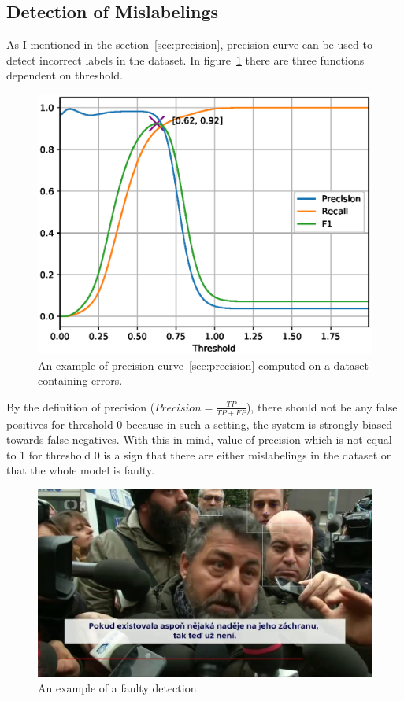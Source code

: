 \subsection{Detection of Mislabelings}\label{subsec:detection-mislabelings}
As I mentioned in the section~\ref{sec:precision}, precision curve can be used to detect incorrect labels in the
dataset.
In figure~\ref{fig:faulty_prft} there are three functions dependent on threshold.

\begin{figure}[H]
    \centering
    \includegraphics[width=0.9\columnwidth]{images/implementation/faulty_prft.eps}
    \caption{An example of precision curve~\ref{sec:precision} computed on a dataset containing errors.}
    \label{fig:faulty_prft}
\end{figure}

By the definition of precision ($Precision = \frac{TP}{TP+FP}$), there should not be any false positives
for threshold 0 because in such a setting, the system is strongly biased towards false negatives.
With this in mind, value of precision which is not equal to 1 for threshold 0 is a sign that there are either
mislabelings in the dataset or that the whole model is faulty.

\begin{figure}[H]
    \centering
    \includegraphics[width=0.9\columnwidth]{images/implementation/faulty_detection.jpg}
    \caption{An example of a faulty detection.}
    \label{fig:faulty_bbox}
\end{figure}

